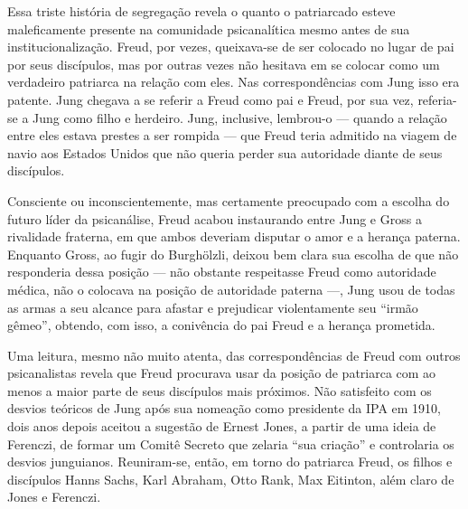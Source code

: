 Essa triste história de segregação revela o quanto o patriarcado esteve
maleficamente presente na comunidade psicanalítica mesmo antes de sua
institucionalização. Freud, por vezes, queixava-se de ser colocado no
lugar de pai por seus discípulos, mas por outras vezes não hesitava em
se colocar como um verdadeiro patriarca na relação com eles. Nas
correspondências com Jung isso era patente. Jung chegava a se referir a
Freud como pai e Freud, por sua vez, referia-se a Jung como filho e
herdeiro. Jung, inclusive, lembrou-o --- quando a relação entre eles
estava prestes a ser rompida --- que Freud teria admitido na viagem de
navio aos Estados Unidos que não queria perder sua autoridade diante de
seus discípulos.

Consciente ou inconscientemente, mas certamente preocupado com a escolha
do futuro líder da psicanálise, Freud acabou instaurando entre Jung e
Gross a rivalidade fraterna, em que ambos deveriam disputar o amor e a
herança paterna. Enquanto Gross, ao fugir do Burghölzli, deixou bem
clara sua escolha de que não responderia dessa posição --- não obstante
respeitasse Freud como autoridade médica, não o colocava na posição de
autoridade paterna ---, Jung usou de todas as armas a seu alcance para
afastar e prejudicar violentamente seu ``irmão gêmeo'', obtendo, com
isso, a conivência do pai Freud e a herança prometida.

Uma leitura, mesmo não muito atenta, das correspondências de Freud com
outros psicanalistas revela que Freud procurava usar da posição de
patriarca com ao menos a maior parte de seus discípulos mais próximos.
Não satisfeito com os desvios teóricos de Jung após sua nomeação como
presidente da IPA em 1910, dois anos depois aceitou a sugestão de Ernest
Jones, a partir de uma ideia de Ferenczi, de formar um Comitê Secreto
que zelaria ``sua criação'' e controlaria os desvios junguianos.
Reuniram-se, então, em torno do patriarca Freud, os filhos e discípulos
Hanns Sachs, Karl Abraham, Otto Rank, Max Eitinton, além claro de Jones
e Ferenczi.

